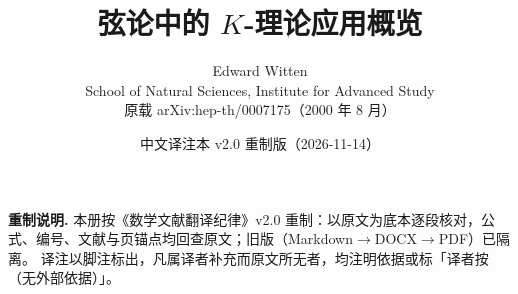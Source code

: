 \documentclass[11pt,a4paper]{ctexart}
\title{\bfseries 弦论中的 $K$-理论应用概览}
\author{Edward Witten\\[2pt]
\small School of Natural Sciences, Institute for Advanced Study\\[-2pt]
\small 原载 arXiv:hep-th/0007175（2000 年 8 月）}
\date{中文译注本 \; v2.0 重制版（2026-11-14）}
\begin{document}
\maketitle
\thispagestyle{empty}

\begin{center}
\begin{minipage}{0.86\textwidth}
\small
\textbf{重制说明.} 本册按《数学文献翻译纪律》v2.0 重制：以原文为底本逐段核对，公式、编号、文献与页锚点均回查原文；旧版（Markdown$\to$DOCX$\to$PDF）已隔离。
译注以脚注标出，凡属译者补充而原文所无者，均注明依据或标「译者按（无外部依据）」。
\end{minipage}
\end{center}

\vspace{0.6em}

\end{document}
